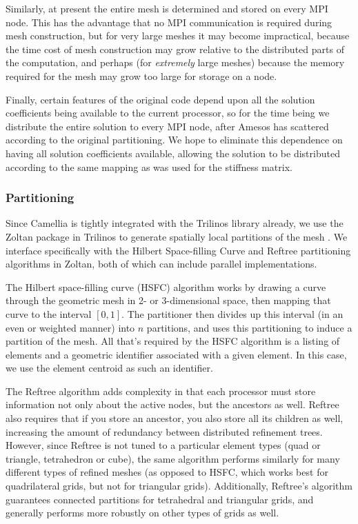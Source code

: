 Similarly, at present the entire mesh is determined and stored on every MPI node.  This has the advantage that no MPI communication is required during mesh construction, but for very large meshes it may become impractical, because the time cost of mesh construction may grow relative to the distributed parts of the computation, and perhaps (for \emph{extremely} large meshes) because the memory required for the mesh may grow too large for storage on a node.

Finally, certain features of the original code depend upon all the solution coefficients being available to the current processor, so for the time being we distribute the entire solution to every MPI node, after Amesos has scattered according to the original partitioning.  We hope to eliminate this dependence on having all solution coefficients available, allowing the solution to be distributed according to the same mapping as was used for the stiffness matrix.

\subsubsection{Partitioning}

Since Camellia is tightly integrated with the Trilinos library already, we use the Zoltan package in Trilinos to generate spatially local partitions of the mesh \cite{ZoltanOverviewArticle}. We interface specifically with the Hilbert Space-filling Curve and Reftree partitioning algorithms in Zoltan, both of which can include parallel implementations. 

The Hilbert space-filling curve (HSFC) algorithm works by drawing a curve through the geometric mesh in 2- or 3-dimensional space, then mapping that curve to the interval $[0,1]$. The partitioner then divides up this interval (in an even or weighted manner) into $n$ partitions, and uses this partitioning to induce a partition of the mesh. All that's required by the HSFC algorithm is a listing of elements and a geometric identifier associated with a given element. In this case, we use the element centroid as such an identifier. 

The Reftree algorithm \cite{REFTREE} adds complexity in that each processor must store information not only about the active nodes, but the ancestors as well. Reftree also requires that if you store an ancestor, you also store all its children as well, increasing the amount of redundancy between distributed refinement trees. However, since Reftree is not tuned to a particular element types (quad or triangle, tetrahedron or cube), the same algorithm performs similarly for many different types of refined meshes (as opposed to HSFC, which works best for quadrilateral grids, but not for triangular grids).  Additionally, Reftree's algorithm guarantees connected partitions for tetrahedral and triangular grids, and generally performs more robustly on other types of grids as well.

